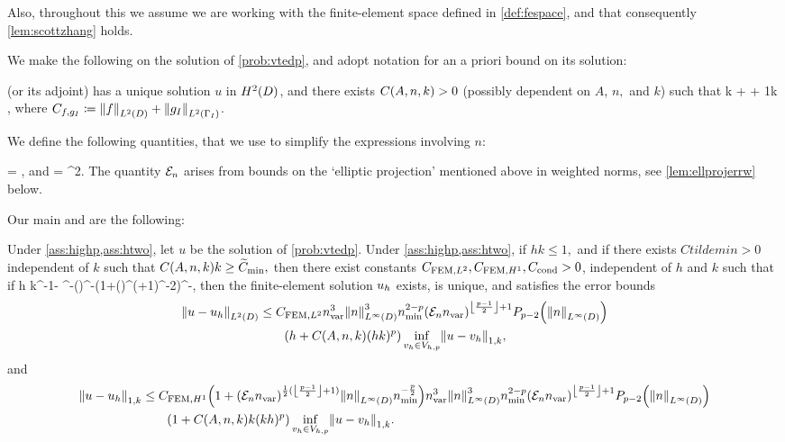 Also, throughout this  we assume we are working with the finite-element space defined in \cref{def:fespace}, and that consequently \cref{lem:scottzhang} holds.

We make the following  on the solution of \cref{prob:vtedp}, and adopt notation for an a priori bound on its solution:

\bas\label{ass:htwo}
 (or its adjoint) has a unique solution $u$ in $\HtD$, and there exists $\CAnk>0$ (possibly dependent on $A$, $n,$ and $k$) such that
\beq\label{eq:generalhtwo}
k  +  + \frac1k  \leq \CAnk \Cfg,
\eeq
where $\Cfg \de \NLtD{f} + \NLtGI{\gI}$.
\eas

We define the following quantities, that we use to simplify the expressions involving $n$:

\beqs
\nvar = ,
\eeqs
and
\beqs
\En = \max\set{\frac{\NHsD{n}}{\nmin} \st s \in (d/2,p-1],\frac{\NWsiD{n}}{\nmin}\st s \in [2,d/2],1}\nvar^2.
\eeqs
The quantity $\mathcal E_{n}$ arises from bounds on the `elliptic projection' mentioned above in weighted norms, see \cref{lem:ellprojerrw} below.

Our main  and  are the following:

\label{thm:fembound}
Under \cref{ass:highp,ass:htwo}, let $u$ be the solution of \cref{prob:vtedp}. Under \cref{ass:highp,ass:htwo}, if $hk \leq 1,$ and if there exists $Ctildemin > 0$ independent of $k$ such that $\CAnk k \geq \Ctildemin,$ then there exist constants $C_{\mathrm{FEM},L^{2}}, C_{\mathrm{FEM},H^{1}}, C_{\mathrm{cond}} > 0$, independent of $h$ and $k$ such that if
\beq\label{eq:hfemcond}
h \leq \Chcond k^{-1-} \CAnk^{-}\mleft(\mright)^{-}\mleft(1+\mleft(\En\nvar\mright)^{\half(+1)}\nmin^{-2}\mright)^{-},
\eeq
then the finite-element solution $u_{h}$ exists, is unique, and satisfies the error bounds
\begin{align}
\NLtD{u-\uh} &\leq \CFEMLt \nvar^3\NLiD{n}^3\nmin^{2-p} \mleft(\En \nvar\mright)^{\floor{\frac{p-1}2}+1}\Pfn{p-2}\mleft(\NLiD{n}\mright)\nonumber\\
&\quad\quad\mleft(h +  \CAnk (hk)^{p}\mright)\inf_{\vh \in \Vhp} \NW{u-\vh},\label{eq:femltbound}
\end{align}
and
\begin{align}
\NW{u-\uh} &\leq \CFEMHo \mleft(1+\mleft(\En\nvar\mright)^{\half(\floor{\frac{p-1}2}+1)}\NLiD{n}\nmin^{-\frac{p}2}\mright)\nvar^3\NLiD{n}^3\nmin^{2-p} \mleft(\En \nvar\mright)^{\floor{\frac{p-1}2}+1}\Pfn{p-2}\mleft(\NLiD{n}\mright)\nonumber\\
&\quad\quad\mleft(1 + \CAnk k(kh)^p\mright) \inf_{\vh \in \Vhp} \NW{u-\vh}.\label{eq:femhobound}
\end{align}
\enth

